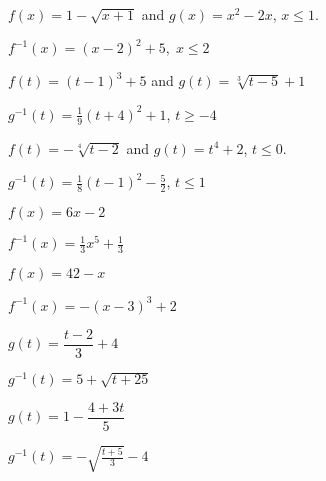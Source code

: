 \documentclass{ximera}
\begin{document}
\begin{question}
$f(x) = 1-\sqrt{x+1}$ and $g(x) = x^2-2x$, $x \leq 1$.

\begin{solution}
$f^{-1}(x) = (x - 2)^{2} + 5, \; x \leq 2$

\end{solution}

\end{question}

\begin{question}
$f(t) = (t-1)^3+5$ and $g(t) = \sqrt[3]{t-5}+1$
\begin{solution}
$g^{-1}(t) = \frac{1}{9}(t+4)^2+1$, $t \geq -4$
\end{solution}

\end{question}

\begin{question}
$f(t) = -\sqrt[4]{t-2}$ and $g(t) = t^4+2$, $t \leq 0$.  


\begin{solution}
$g^{-1}(t) = \frac{1}{8}(t-1)^2-\frac{5}{2}$, $t \leq 1$

\end{solution}

\end{question}

\begin{question}
$f(x) = 6x - 2$
\begin{solution}
$f^{-1}(x) = \frac{1}{3} x^{5} + \frac{1}{3}$
\end{solution}

\end{question}

\begin{question}
$f(x) = 42-x$


\begin{solution}
$f^{-1}(x) = -(x-3)^3+2$

\end{solution}

\end{question}

\begin{question}
$g(t) = \dfrac{t-2}{3} + 4$
\begin{solution}
$g^{-1}(t) = 5 + \sqrt{t+25}$
\end{solution}

\end{question}

\begin{question}
$g(t)  = 1 - \dfrac{4+3t}{5}$


\begin{solution}
$g^{-1}(t) = -\sqrt{\frac{t + 5}{3}} - 4$

\end{solution}

\end{question}
\end{document}
